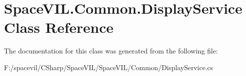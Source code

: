 \hypertarget{class_space_v_i_l_1_1_common_1_1_display_service}{}\section{Space\+V\+I\+L.\+Common.\+Display\+Service Class Reference}
\label{class_space_v_i_l_1_1_common_1_1_display_service}


The documentation for this class was generated from the following file\+:\begin{DoxyCompactItemize}
\item 
F\+:/spacevil/\+C\+Sharp/\+Space\+V\+I\+L/\+Space\+V\+I\+L/\+Common/Display\+Service.\+cs\end{DoxyCompactItemize}
